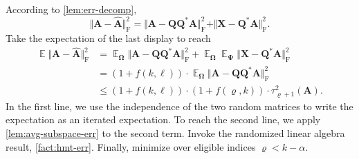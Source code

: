 \documentclass[final]{siamart1116}
\numberwithin{equation}{section}
\numberwithin{theorem}{section}
\numberwithin{figure}{section}
\newcommand{\mtx}[1]{\bm{#1}}
\newcommand{\norm}[1]{\Vert #1 \Vert}
\newcommand{\fnorm}[1]{\norm{#1}_{\mathrm{F}}}
\newcommand{\fnormsq}[1]{\fnorm{#1}^2}
\newcommand{\Expect}{\operatorname{\mathbb{E}}}
\begin{document}
According to \cref{lem:err-decomp},
$$
\fnormsq{ \mtx{A} - \hat{\mtx{A}} }
	= \fnormsq{ \mtx{A} - \mtx{QQ}^* \mtx{A} } + \fnormsq{ \mtx{X} - \mtx{Q}^* \mtx{A} }.
$$
Take the expectation of the last display to reach
$$
\begin{aligned}
\Expect \fnormsq{\mtx{A} - \hat{\mtx{A}}}
	&= \Expect_{\mtx{\Omega}} \fnormsq{\mtx{A} - \mtx{QQ}^* \mtx{A}}
	+ \Expect_{\mtx{\Omega}} \Expect_{\mtx{\Psi}} \fnormsq{ \mtx{X} - \mtx{Q}^* \mtx{A}} \\
	&= (1+f(k,\ell)) \cdot \Expect_{\mtx{\Omega}} \fnormsq{\mtx{A} - \mtx{QQ}^* \mtx{A}} \\
	&\leq (1+ f(k,\ell)) \cdot (1+f(\varrho, k)) \cdot \tau_{\varrho+1}^2(\mtx{A}).
\end{aligned}
$$
In the first line, we use the independence of the two random matrices to
write the expectation as an iterated expectation.  To reach the second line,
we apply \cref{lem:avg-subspace-err} to the second term.
Invoke the randomized linear algebra result, \cref{fact:hmt-err}.
Finally, minimize over eligible indices $\varrho < k - \alpha$.
\end{document}
